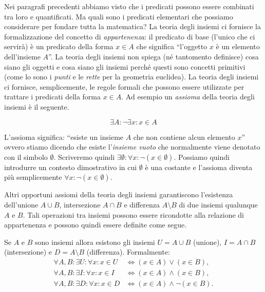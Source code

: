 Nei paragrafi precedenti abbiamo visto che i predicati possono essere
combinati tra loro e quantificati.
Ma quali sono i predicati elementari che possiamo considerare per fondare 
tutta la matematica?
La teoria degli insiemi ci fornisce la formalizzazione del concetto
di \emph{appartenenza}: il predicato di base (l'unico che ci servirà) è
un predicato della forma $x \in A$ che significa ``l'oggetto $x$ è un elemento
dell'insieme $A$''.
La teoria degli insiemi non spiega (né tantomento definisce)
cosa siano gli oggetti e cosa siano gli insiemi perché questi sono concetti
primitivi (come lo sono i \emph{punti} e le \emph{rette} per la geometria euclidea).
La teoria degli insiemi ci fornisce, semplicemente, le regole formali che
possono essere utilizzate per trattare i predicati della forma $x\in A$.
Ad esempio un \emph{assioma} 
della teoria degli insiemi è il seguente.
\begin{axiom}
\[
  \exists A \colon \lnot \exists x\colon x \in A
\]
\end{axiom}
L'assioma significa: ``esiste un insieme $A$ che non contiene alcun elemento $x$''
ovvero stiamo dicendo che esiste l'\emph{insieme vuoto}%
%
 che normalmente viene
denotato con il simbolo $\emptyset$.
Scriveremo quindi $\exists\emptyset\colon \forall x\colon \lnot(x\in \emptyset)$.
Possiamo quindi introdurre un contesto dimostrativo 
in cui $\emptyset$ è una costante e l'assioma diventa più
semplicemente $\forall x\colon \lnot (x\in \emptyset)$.

Altri opportuni assiomi della teoria degli insiemi garantiscono l'esistenza
dell'unione $A\cup B$, intersezione $A\cap B$ e differenza $A\setminus B$
di due insiemi qualunque $A$ e $B$. Tali operazioni
tra insiemi possono essere ricondotte alla relazione di appartenenza
e possono quindi essere definite come segue.

\begin{axiom}
Se $A$ e $B$ sono insiemi allora esistono gli insiemi  
$U=A\cup B$ (unione), $I=A\cap B$ (intersezione) e 
$D=A\setminus B$ (differenza).
%
%
%
%
Formalmente:
\begin{align*}
    \forall A,B\colon \exists U\colon \forall x\colon x\in U &\iff (x\in A) \lor (x\in B),\\
    \forall A,B\colon \exists I\colon \forall x\colon x\in I &\iff (x\in A) \land (x\in B),\\
    \forall A,B\colon \exists D\colon \forall x\colon x\in D &\iff (x\in A) \land \lnot (x \in B).
\end{align*}
\end{axiom}

